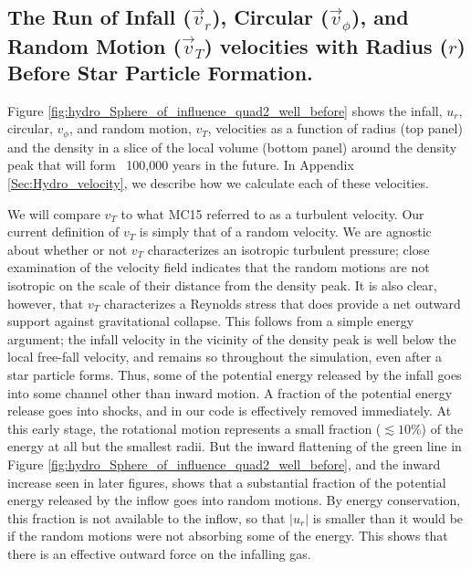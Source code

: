 \documentclass[../dissertation.tex]{subfiles}
\begin{document}
\subsection{The Run of Infall ($\vec{v}_r$), Circular ($\vec{v}_\phi$), and %
 Random Motion ($\vec{v}_T$) velocities with Radius ($r$) Before Star Particle Formation.}

Figure \ref{fig:hydro_Sphere_of_influence_quad2_well_before} shows the infall, $u_r$, circular, $v_{\phi}$, and random motion, $v_T$, velocities as a function of  radius (top panel) and the density in a slice of the local volume 
(bottom panel) around the density peak that will form \partA\ 100,000 years in the future. 
In Appendix \ref{Sec:Hydro_velocity}, we describe how we calculate each of these velocities.

We will compare $v_T$ to what  MC15 referred to as a turbulent velocity. Our current definition of $v_T$ is simply that of a random velocity. 
We are agnostic about whether or not $v_T$ characterizes an isotropic turbulent pressure; close examination of the velocity field indicates that the random motions are not isotropic on the scale of their distance from the density peak. It is also clear, however, that $v_T$ characterizes a Reynolds stress that does provide a net outward support against gravitational collapse. This follows from a simple energy argument; the infall velocity in the vicinity of the density peak is well below the local free-fall velocity, and remains so throughout the simulation, even after a star particle forms. Thus, some of the potential energy released by the infall goes into some channel other than inward motion. A fraction of the potential energy release goes into shocks, and in our code is effectively removed immediately. At this early stage, the rotational motion represents a small fraction ($\lesssim10\%$) of the energy at all but the smallest radii. But the inward flattening of the green line in Figure
\ref{fig:hydro_Sphere_of_influence_quad2_well_before}, and the inward increase seen in later figures, shows that a substantial fraction of the potential energy released by the inflow goes into random motions. By energy conservation, this fraction is not available to the inflow, so that $|u_r|$ is smaller than it would be if the random motions were not absorbing some of the energy. This shows that there is an effective outward force on the infalling gas. 
%
\end{document}
